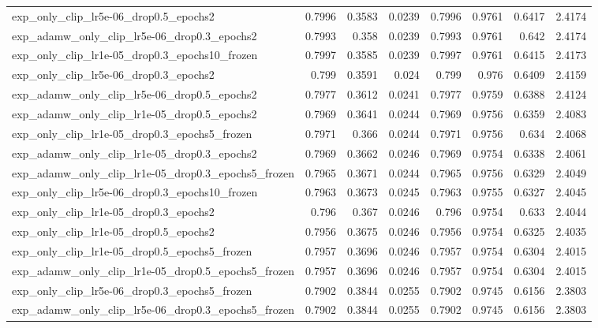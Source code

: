 \documentclass[a4paper,oneside,bibliography=totoc]{scrbook}
\begin{document}
\begin{landscape}
\begin{center}
\begin{longtable}{p{4cm} *{7}{r}}
exp\_only\_clip\_lr5e-06\_drop0.5\_epochs2 & 0.7996 & 0.3583 & 0.0239 & 0.7996 & 0.9761 & 0.6417 & 2.4174 \\ 
        exp\_adamw\_only\_clip\_lr5e-06\_drop0.3\_epochs2 & 0.7993 & 0.358 & 0.0239 & 0.7993 & 0.9761 & 0.642 & 2.4174 \\ 
        exp\_only\_clip\_lr1e-05\_drop0.3\_epochs10\_frozen & 0.7997 & 0.3585 & 0.0239 & 0.7997 & 0.9761 & 0.6415 & 2.4173 \\ 
        exp\_only\_clip\_lr5e-06\_drop0.3\_epochs2 & 0.799 & 0.3591 & 0.024 & 0.799 & 0.976 & 0.6409 & 2.4159 \\ 
        exp\_adamw\_only\_clip\_lr5e-06\_drop0.5\_epochs2 & 0.7977 & 0.3612 & 0.0241 & 0.7977 & 0.9759 & 0.6388 & 2.4124 \\ 
        exp\_adamw\_only\_clip\_lr1e-05\_drop0.5\_epochs2 & 0.7969 & 0.3641 & 0.0244 & 0.7969 & 0.9756 & 0.6359 & 2.4083 \\ 
        exp\_only\_clip\_lr1e-05\_drop0.3\_epochs5\_frozen & 0.7971 & 0.366 & 0.0244 & 0.7971 & 0.9756 & 0.634 & 2.4068 \\ 
        exp\_adamw\_only\_clip\_lr1e-05\_drop0.3\_epochs2 & 0.7969 & 0.3662 & 0.0246 & 0.7969 & 0.9754 & 0.6338 & 2.4061 \\ 
        exp\_adamw\_only\_clip\_lr1e-05\_drop0.3\_epochs5\_frozen & 0.7965 & 0.3671 & 0.0244 & 0.7965 & 0.9756 & 0.6329 & 2.4049 \\ 
        exp\_only\_clip\_lr5e-06\_drop0.3\_epochs10\_frozen & 0.7963 & 0.3673 & 0.0245 & 0.7963 & 0.9755 & 0.6327 & 2.4045 \\ 
        exp\_only\_clip\_lr1e-05\_drop0.3\_epochs2 & 0.796 & 0.367 & 0.0246 & 0.796 & 0.9754 & 0.633 & 2.4044 \\ 
        exp\_only\_clip\_lr1e-05\_drop0.5\_epochs2 & 0.7956 & 0.3675 & 0.0246 & 0.7956 & 0.9754 & 0.6325 & 2.4035 \\ 
        exp\_only\_clip\_lr1e-05\_drop0.5\_epochs5\_frozen & 0.7957 & 0.3696 & 0.0246 & 0.7957 & 0.9754 & 0.6304 & 2.4015 \\ 
        exp\_adamw\_only\_clip\_lr1e-05\_drop0.5\_epochs5\_frozen & 0.7957 & 0.3696 & 0.0246 & 0.7957 & 0.9754 & 0.6304 & 2.4015 \\ 
        exp\_only\_clip\_lr5e-06\_drop0.3\_epochs5\_frozen & 0.7902 & 0.3844 & 0.0255 & 0.7902 & 0.9745 & 0.6156 & 2.3803 \\ 
        exp\_adamw\_only\_clip\_lr5e-06\_drop0.3\_epochs5\_frozen & 0.7902 & 0.3844 & 0.0255 & 0.7902 & 0.9745 & 0.6156 & 2.3803 \\ 

\end{longtable}
\end{center}
\end{landscape}
\end{document}
